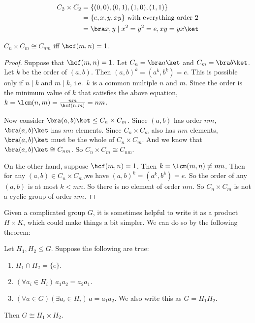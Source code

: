 \documentclass[a4paper]{article}
\begin{document}
\begin{eg}
  \begin{align*}
    C_2\times C_2 &= \{(0, 0), (0, 1), (1, 0), (1, 1)\}\\
    &= \{e, x, y, xy\} \text{ with everything order 2}\\
    &= \bra x, y\mid x^2=y^2=e, xy = yx\ket
  \end{align*}
\end{eg}

\begin{prop}
  $C_n\times C_m\cong C_{nm}$ iff $\hcf(m, n) = 1$.
\end{prop}

\begin{proof}
  Suppose that $\hcf(m, n) = 1$. Let $C_n = \bra a\ket$ and $C_m = \bra b \ket$. Let $k$ be the order of $(a, b)$. Then $(a, b)^k = (a^k, b^k) = e$. This is possible only if $n \mid k$ and $m \mid k$, i.e.\ $k$ is a common multiple $n$ and $m$. Since the order is the minimum value of $k$ that satisfies the above equation, $k = \lcm(n, m) = \frac{nm}{\hcf(n, m)} = nm$.

  Now consider $\bra (a, b)\ket \leq C_n\times C_m$. Since $(a, b)$ has order $nm$, $\bra (a, b)\ket$ has $nm$ elements. Since $C_n\times C_m$ also has $nm$ elements, $\bra (a, b)\ket$ must be the whole of $C_n\times C_m$. And we know that $\bra (a, b)\ket\cong C_{nm}$. So $C_n\times C_m \cong C_{nm}$.

  On the other hand, suppose $\hcf(m, n) = 1$. Then $k = \lcm(m, n) \not= mn$. Then for any $(a, b)\in C_n \times C_m$,we have $(a, b)^k = (a^k, b^k) = e$. So the order of any $(a, b)$ is at most $k < mn$. So there is no element of order $mn$. So $C_n\times C_m$ is not a cyclic group of order $nm$.
\end{proof}

Given a complicated group $G$, it is sometimes helpful to write it as a product $H\times K$, which could make things a bit simpler. We can do so by the following theorem:
\begin{prop}
  Let $H_1, H_2\leq G$. Suppose the following are true:
  \begin{enumerate}
    \item $H_1\cap H_2 = \{e\}$.
    \item $(\forall a_i\in H_i)\, a_1a_2=a_2a_1$.
    \item $(\forall a\in G)(\exists a_i\in H_i)\,a = a_1a_2$. We also write this as $G=H_1H_2$.
  \end{enumerate}
  Then $G\cong H_1\times H_2$.
\end{prop}
\end{document}
